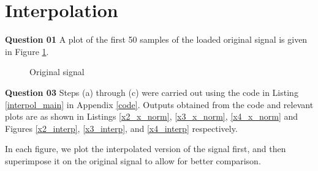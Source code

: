 \documentclass{article}[a4paper]
\begin{document}
	\section{Interpolation}
	
	\textbf{Question 01} A plot of the first 50 samples of the loaded original signal is given in Figure \ref{orig_x1}.
	
	\begin{figure}[H]
		\centering
		\caption{Original signal}
		\label{orig_x1}
	\end{figure}
	
	\textbf{Question 03} Steps (a) through (c) were carried out using the code in Listing \ref{interpol_main} in Appendix \ref{code}. Outputs obtained from the code and relevant plots are as shown in Listings \ref{x2_x_norm}, \ref{x3_x_norm}, \ref{x4_x_norm} and Figures \ref{x2_interp}, \ref{x3_interp}, and \ref{x4_interp} respectively.
	
	In each figure, we plot the interpolated version of the signal first, and then superimpose it on the original signal to allow for better comparison.
	
\end{document}
